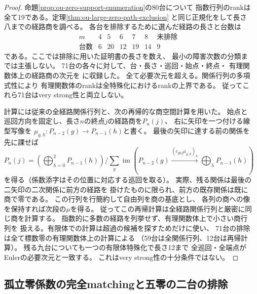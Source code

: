 \begin{proof}
命題\ref{prop:ou-zero-support-enumeration}の80台について
指数行列のrankは全て19である。定理\ref{thm:ou-large-zero-path-exclusion}
と同じ正規化をして長さ八までの経路商を調べる。
各台を排除するために選んだ経路の長さと台数は
\[
\begin{array}{c|rrrrr|r}
m&4&5&6&7&8&\text{未排除}\\ \hline
\text{台数}&6&20&12&19&14&9
\end{array}
\]
である。ここでは排除に用いた証明書の長さを数え、
最小の障害次数の分類までは主張しない。
71台の各々に対して、台・長さ・巡回・始点・終点・
有理関数体上の経路商の次元を
に収録した。
全て必要次元を超える。関係行列の多項式性により
有理関数体のrankは全特殊化におけるrankの上界である。
従ってこれら71台はvery strong性と両立しない。

計算には従来の全経路関係行列と、次の再帰的な商空間計算を用いた。
始点と巡回方向を固定し、長さ$n$の終点$j$の経路商を$P_n(j)$、
右に矢印を一つ付ける線型写像を
$\mu_{g,h}:P_{n-2}(g)\to P_{n-1}(h)$と書く。
最後の矢印に達する前の関係を先に課せば
\[
 P_n(j)=\left(\bigoplus_{h=0}^2P_{n-1}(h)\right)
 \Big/\sum_g\operatorname{im}\!
 \left(P_{n-2}(g)\xrightarrow{(c_{ghj}\mu_{g,h})_h}
 \bigoplus_h P_{n-1}(h)\right)
\]
を得る（係数添字はその位置に対応する巡回を取る）。
実際、残る関係は最後の二矢印の二次関係に前方の経路を
掛けたものに限られ、前方の既存関係は既に商で零である。
この行列を行簡約して自由列を商の基底とし、
各列の商への像を保持すれば次段の$\mu$を得る。
従ってこの再帰計算は全経路関係行列と厳密に同じ商を計算する。
指数的に多数の経路を列挙せず、有理関数体上で小さい商行列を
扱える。有限体での計算は超過の候補を探すためだけに使い、
71台の排除は全て標数零の有理関数体上の計算による
（59台は全関係行列、12台は再帰計算）。
残る九台についても一つの有限体特殊化で長さ12まで
全巡回・全端点がEulerの必要次元と一致する。
これはvery strong性の十分条件ではない。
\end{proof}

\subsection{孤立零係数の完全matchingと五零の二台の排除}

